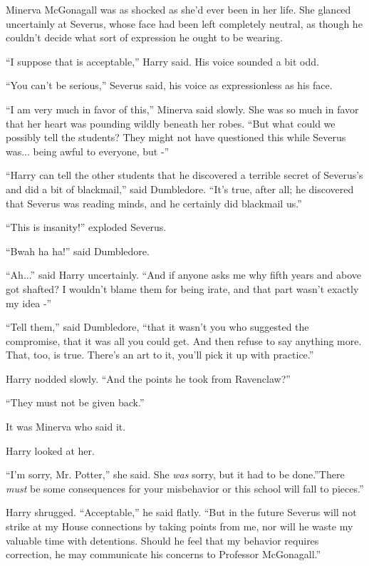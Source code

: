 Minerva McGonagall was as shocked as she'd ever been in her life. She
glanced uncertainly at Severus, whose face had been left completely
neutral, as though he couldn't decide what sort of expression he ought
to be wearing.

``I suppose that is acceptable,'' Harry said. His voice sounded a bit
odd.

``You can't be serious,'' Severus said, his voice as expressionless as
his face.

``I am very much in favor of this,'' Minerva said slowly. She was so
much in favor that her heart was pounding wildly beneath her robes.
``But what could we possibly tell the students? They might not have
questioned this while Severus was... being awful to everyone, but
-''

``Harry can tell the other students that he discovered a terrible secret
of Severus's and did a bit of blackmail,'' said Dumbledore. ``It's true,
after all; he discovered that Severus was reading minds, and he
certainly did blackmail us.''

``This is insanity!'' exploded Severus.

``Bwah ha ha!'' said Dumbledore.

``Ah...'' said Harry uncertainly. ``And if anyone asks me why fifth
years and above got shafted? I wouldn't blame them for being irate, and
that part wasn't exactly my idea -''

``Tell them,'' said Dumbledore, ``that it wasn't you who suggested the
compromise, that it was all you could get. And then refuse to say
anything more. That, too, is true. There's an art to it, you'll pick it
up with practice.''

Harry nodded slowly. ``And the points he took from Ravenclaw?''

``They must not be given back.''

It was Minerva who said it.

Harry looked at her.

``I'm sorry, Mr. Potter,'' she said. She \emph{was} sorry, but it had to
be done.''There \emph{must} be some consequences for your misbehavior or
this school will fall to pieces.''

Harry shrugged. ``Acceptable,'' he said flatly. ``But in the future
Severus will not strike at my House connections by taking points from
me, nor will he waste my valuable time with detentions. Should he feel
that my behavior requires correction, he may communicate his concerns to
Professor McGonagall.''

